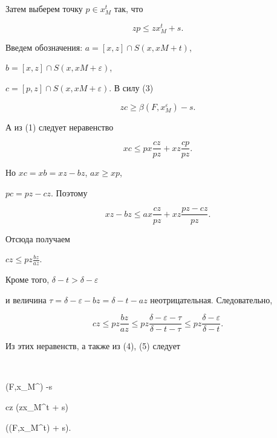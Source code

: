 Затем выберем точку $p \in x_{M}^{t}$ так, что


\begin{equation}


zp \leq zx_{M}^{t} + s.


\end{equation}


Введем обозначения: $a = [x,z]\cap S(x,xM + t)$,


$b = [x,z]\cap S(x,xM + \varepsilon )$, 


$c = [p,z]\cap S(x,xM + \varepsilon )$. В силу (3)


\begin{equation}


zc \geq \beta (F,x_{M}^{\varepsilon }) - s.


\end{equation}


А из (1) следует неравенство


$$


xc \leq px\frac{cz}{pz} + xz\frac{cp}{pz}.


$$


Но $xc = xb = xz - bz$, $ax \geq xp$,


$pc = pz - cz$. Поэтому 


$$


xz - bz \leq ax\frac{cz}{pz} + xz\frac{pz - cz}{pz}.


$$


Отсюда получаем


$cz \leq pz\frac{bz}{az}$.


Кроме того, $\delta - t > \delta - \varepsilon$


и величина $\tau = \delta - \varepsilon - bz =


\delta - t - az$ неотрицательная. Следовательно, 


$$


cz \leq pz\frac{bz}{az} \leq


pz\frac{\delta - \varepsilon - \tau }{\delta - t - \tau } \leq


pz\frac{\delta - \varepsilon}{\delta - t}. 


$$


Из этих неравенств, а также из (4), (5) следует


$$


\beta (F,x_{M}^{\varepsilon }) -s \leq


cz \leq (zx_{M}^{t} + s) 


\leq (\beta (F,x_{M}^{t}) + s).


